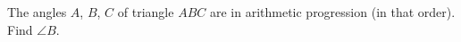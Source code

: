 The angles $A$, $B$, $C$ of triangle $ABC$ are in arithmetic progression (in that order). Find $\angle B$.
